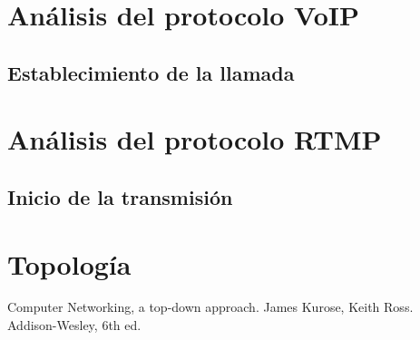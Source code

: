 \documentclass[10pt]{article}
\begin{document}
\section{Análisis del protocolo VoIP}
\subsection{Establecimiento de la llamada}


\renewcommand{\thesection}{8.\arabic{section}}
\section{Análisis del protocolo RTMP}
\subsection{Inicio de la transmisión}


\renewcommand{\thesection}{9.\arabic{section}}
\setcounter{section}{0}
\section{Topología}












\begin{thebibliography}{9}


  Computer Networking, a top-down approach. James Kurose, Keith Ross. Addison-Wesley, 6th ed.

  \end{thebibliography}
\end{document}
